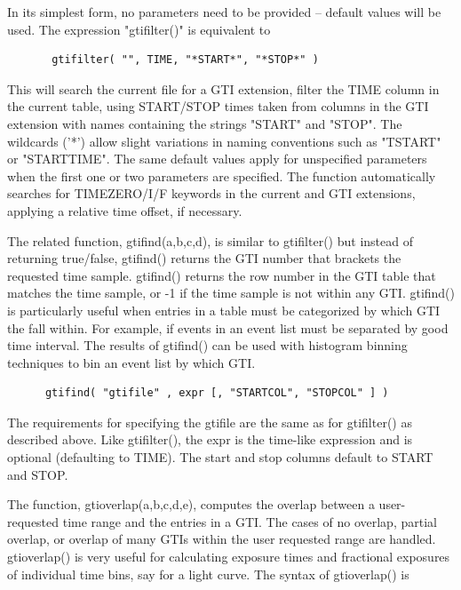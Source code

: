 \documentclass[11pt]{book}
\begin{document}
    In  its  simplest form, no parameters need to be provided -- default
    values will be used.  The expression "gtifilter()" is equivalent to

\begin{verbatim}
       gtifilter( "", TIME, "*START*", "*STOP*" )
\end{verbatim}
    This will search the current file for a GTI  extension,  filter  the
    TIME  column in the current table, using START/STOP times taken from
    columns in the GTI  extension  with  names  containing  the  strings
    "START"  and "STOP".  The wildcards ('*') allow slight variations in
    naming conventions  such  as  "TSTART"  or  "STARTTIME".   The  same
    default  values  apply for unspecified parameters when the first one
    or  two  parameters  are  specified.   The  function   automatically
    searches   for   TIMEZERO/I/F   keywords  in  the  current  and  GTI
    extensions, applying a relative time offset, if necessary.

    The related function, gtifind(a,b,c,d), is similar to gtifilter()
    but instead of returning true/false, gtifind() returns the GTI
    number that brackets the requested time sample.  gtifind() returns
    the row number in the GTI table that matches the time sample, or
    -1 if the time sample is not within any GTI.  gtifind() is
    particularly useful when entries in a table must be categorized by
    which GTI the fall within.  For example, if events in an event
    list must be separated by good time interval.  The results of
    gtifind() can be used with histogram binning techniques to bin an
    event list by which GTI.

\begin{verbatim}
      gtifind( "gtifile" , expr [, "STARTCOL", "STOPCOL" ] )
\end{verbatim}

    The requirements for specifying the gtifile are the same as for
    gtifilter() as described above.  Like gtifilter(), the expr is
    the time-like expression and is optional (defaulting to TIME).
    The start and stop columns default to START and STOP.

    The function, gtioverlap(a,b,c,d,e), computes the overlap
    between a user-requested time range and the entries in a GTI.  The
    cases of no overlap, partial overlap, or overlap of many GTIs
    within the user requested range are handled.  gtioverlap() is very
    useful for calculating exposure times and fractional exposures of
    individual time bins, say for a light curve.  The syntax of
    gtioverlap() is
\end{document}
